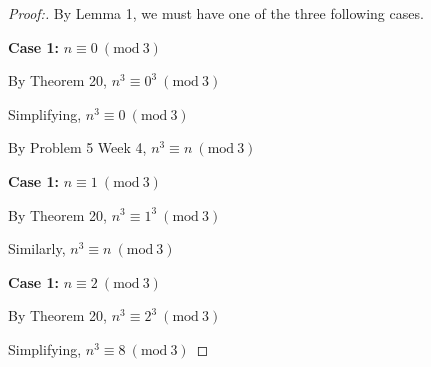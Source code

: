 \documentclass[12pt]{article}
\newcommand{\Mod}[1]{\ (\mathrm{mod}\ #1)}
\begin{document}
\begin{proof}[Proof:]
    By Lemma 1, we must have one of the three following cases.

    \textbf{Case 1:} $n \equiv 0 \Mod{3}$

    By Theorem 20, $n^3 \equiv 0^3 \Mod{3}$

    Simplifying, $n^3 \equiv 0 \Mod{3}$

    By Problem 5 Week 4, $n^3 \equiv n \Mod{3}$

    \textbf{Case 1:} $n \equiv 1 \Mod{3}$

    By Theorem 20, $n^3 \equiv 1^3 \Mod{3}$

    Similarly, $n^3 \equiv n \Mod{3}$

    \textbf{Case 1:} $n \equiv 2 \Mod{3}$

    By Theorem 20, $n^3 \equiv 2^3 \Mod{3}$

    Simplifying, $n^3 \equiv 8 \Mod{3}$
\end{proof}
\end{document}
